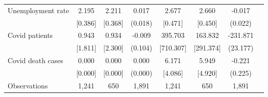 \begin{tabular}{l*{7}{c}}
Unemployment rate   &       2.195&       2.211&       0.017&       2.677&       2.660&      -0.017\\
                    &     [0.386]&     [0.368]&     (0.018)&     [0.471]&     [0.450]&     (0.022)\\
Covid patients      &       0.943&       0.934&      -0.009&     395.703&     163.832&    -231.871\\
                    &     [1.811]&     [2.300]&     (0.104)&   [710.307]&   [291.374]&    (23.177)\\
Covid death cases   &       0.000&       0.000&       0.000&       6.171&       5.949&      -0.221\\
                    &     [0.000]&     [0.000]&     (0.000)&     [4.086]&     [4.920]&     (0.225)\\
\midrule
Observations        &       1,241&         650&       1,891&       1,241&         650&       1,891\\
\bottomrule \end{tabular}
